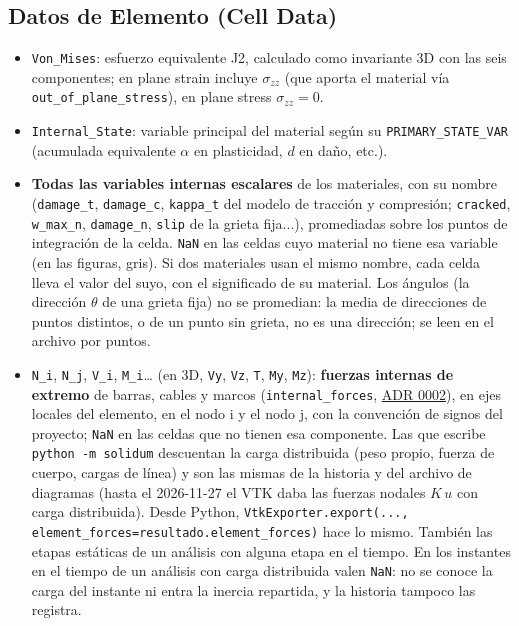 \documentclass[11pt,oneside]{report}
\begin{document}
\subsection{Datos de Elemento (Cell Data)}

\begin{itemize}
  \item \texttt{Von\_Mises}: esfuerzo equivalente J2, calculado como invariante 3D con las seis componentes; en plane strain incluye $\sigma_{zz}$ (que aporta el material vía \texttt{out\_\allowbreak{}of\_\allowbreak{}plane\_\allowbreak{}stress}), en plane stress $\sigma_{zz} = 0$.
  \item \texttt{Internal\_State}: variable principal del material según su \texttt{PRIMARY\_\allowbreak{}STATE\_\allowbreak{}VAR} (acumulada equivalente $\alpha$ en plasticidad, $d$ en daño, etc.).
  \item \textbf{Todas las variables internas escalares} de los materiales, con su nombre (\texttt{damage\_t}, \texttt{damage\_c}, \texttt{kappa\_t} del modelo de tracción y compresión; \texttt{cracked}, \texttt{w\_max\_n}, \texttt{damage\_n}, \texttt{slip} de la grieta fija...), promediadas sobre los puntos de integración de la celda. \texttt{NaN} en las celdas cuyo material no tiene esa variable (en las figuras, gris). Si dos materiales usan el mismo nombre, cada celda lleva el valor del suyo, con el significado de su material. Los ángulos (la dirección $\theta$ de una grieta fija) no se promedian: la media de direcciones de puntos distintos, o de un punto sin grieta, no es una dirección; se leen en el archivo por puntos.
  \item \texttt{N\_i}, \texttt{N\_j}, \texttt{V\_i}, \texttt{M\_i}\ldots{} (en 3D, \texttt{Vy}, \texttt{Vz}, \texttt{T}, \texttt{My}, \texttt{Mz}): \textbf{fuerzas internas de extremo} de barras, cables y marcos (\texttt{internal\_forces}, \href{https://github.com/jretamav/solidum-fem/blob/main/docs/adr/0002-api-de-resultados-para-consumidores.md}{ADR 0002}), en ejes locales del elemento, en el nodo i y el nodo j, con la convención de signos del proyecto; \texttt{NaN} en las celdas que no tienen esa componente. Las que escribe \texttt{python -m solidum} descuentan la carga distribuida (peso propio, fuerza de cuerpo, cargas de línea) y son las mismas de la historia y del archivo de diagramas (hasta el 2026-11-27 el VTK daba las fuerzas nodales $K\,u$ con carga distribuida). Desde Python, \texttt{VtkExporter.\allowbreak{}export(.\allowbreak{}.\allowbreak{}.\allowbreak{}, element\_\allowbreak{}forces=resultado.\allowbreak{}element\_\allowbreak{}forces)} hace lo mismo. También las etapas estáticas de un análisis con alguna etapa en el tiempo. En los instantes en el tiempo de un análisis con carga distribuida valen \texttt{NaN}: no se conoce la carga del instante ni entra la inercia repartida, y la historia tampoco las registra.
\end{itemize}
\end{document}
